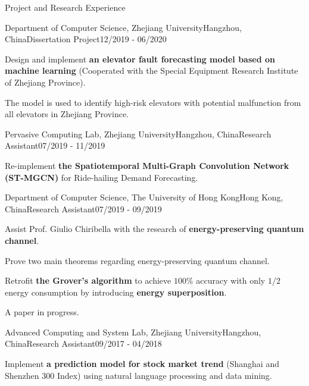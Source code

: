 \documentclass{resume}
\begin{document}
\begin{rSection}{Project and Research Experience}

\begin{rSubsection}{Department of Computer Science, Zhejiang University}{Hangzhou, China}{Dissertation Project}{12/2019 - 06/2020}
\item Design and implement {\bf an elevator fault forecasting model based on machine learning} (Cooperated with the Special Equipment Research Institute of Zhejiang Province).
\item The model is used to identify high-risk elevators with potential malfunction from all elevators in Zhejiang Province.
\end{rSubsection}


\begin{rSubsection}{Pervasive Computing Lab, Zhejiang University}{Hangzhou, China}{Research Assistant}{07/2019 - 11/2019}
\item Re-implement {\bf the Spatiotemporal Multi-Graph Convolution Network (ST-MGCN)} for Ride-hailing Demand Forecasting.
\end{rSubsection}


\begin{rSubsection}{Department of Computer Science, The University of Hong Kong}{Hong Kong, China}{Research Assistant}{07/2019 - 09/2019}
\item Assist Prof. Giulio Chiribella with the research of {\bf energy-preserving quantum channel}.
\item Prove two main theorems regarding energy-preserving quantum channel.
\item Retrofit {\bf the Grover's algorithm} to achieve $100\%$ accuracy with only $1/2$ energy consumption by introducing {\bf energy superposition}.
\item A paper in progress.
\end{rSubsection}


\begin{rSubsection}{Advanced Computing and System Lab, Zhejiang University}{Hangzhou, China}{Research Assistant}{09/2017 - 04/2018}
\item Implement {\bf a prediction model for stock market trend} (Shanghai and Shenzhen 300 Index) using natural language processing and data mining.
\end{rSubsection}

\end{rSection}
\end{document}
